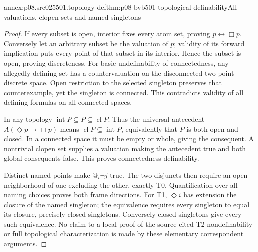 \begin{annexitem}{annex:p08.src025501.topology-def}{thm:p08-bvb501-topological-definability}{All valuations, clopen sets and named singletons}
\begin{proof}
If every subset is open, interior fixes every atom set, proving
\(p\leftrightarrow\Box p\). Conversely let an arbitrary
subset be the valuation of \(p\); validity of its forward
implication puts every point of that subset in its interior. Hence
the subset is open, proving discreteness. For basic undefinability
of connectedness, any allegedly defining set has a countervaluation
on the disconnected two-point discrete space. Open restriction to
the selected singleton preserves that counterexample, yet the
singleton is connected. This contradicts validity of all defining
formulas on all connected spaces.

In any topology \(\operatorname{int}P\subseteq P\subseteq
\operatorname{cl}P\). Thus the universal antecedent
\(A(\Diamond p\to\Box p)\) means
\(\operatorname{cl}P\subseteq\operatorname{int}P\), equivalently
that \(P\) is both open and closed. In a connected space it
must be empty or whole, giving the consequent. A nontrivial clopen
set supplies a valuation making the antecedent true and both global
consequents false. This proves connectedness definability.

Distinct named points make \(@_i\neg j\) true. The two disjuncts
then require an open neighborhood of one excluding the other, exactly
T0. Quantification over all naming choices proves both frame directions.
For T1, \(\Diamond i\) has extension the closure of the named
singleton; the equivalence requires every singleton to equal its
closure, precisely closed singletons. Conversely closed singletons
give every such equivalence. No claim to a local proof of the
source-cited T2 nondefinability or full topological characterization
is made by these elementary correspondent arguments.
\end{proof}
\end{annexitem}
